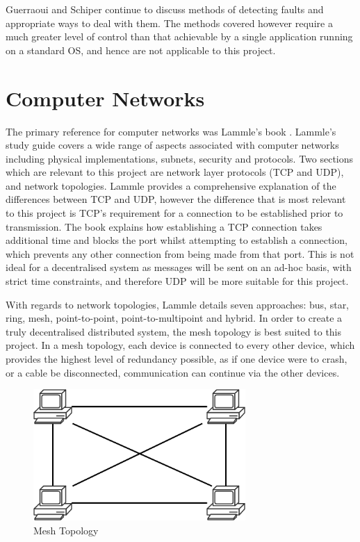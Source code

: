 \documentclass[a4paper, 11pt]{report}
\begin{document}
Guerraoui and Schiper continue to discuss methods of detecting faults and appropriate ways to deal with them. The methods covered however require a much greater level of control than that achievable by a single application running on a standard \acrshort{OS}, and hence are not applicable to this project.

\section{Computer Networks}
The primary reference for computer networks was Lammle's book  \cite{comptiaNet}. Lammle's study guide covers a wide range of aspects associated with computer networks including physical implementations, subnets, security and protocols. Two sections which are relevant to this project are network layer protocols (\acrshort{TCP} and \acrshort{UDP}), and network topologies. Lammle provides a comprehensive explanation of the differences between \acrfull{TCP} and \acrfull{UDP}, however the difference that is most relevant to this project is \acrshort{TCP}'s requirement for a connection to be established prior to transmission. The book explains how establishing a \acrshort{TCP} connection takes additional time and blocks the port whilst attempting to establish a connection, which prevents any other connection from being made from that port. This is not ideal for a decentralised system as messages will be sent on an ad-hoc basis, with strict time constraints, and therefore \acrshort{UDP} will be more suitable for this project.

With regards to network topologies, Lammle details seven approaches: bus, star, ring, mesh, point-to-point, point-to-multipoint and hybrid. In order to create a truly decentralised distributed system, the mesh topology is best suited to this project. In a mesh topology, each device is connected to every other device, which provides the highest level of redundancy possible, as if one device were to crash, or a cable be disconnected, communication can continue via the other devices.

\begin{figure}[H]
\centering
\includegraphics[height=5cm,keepaspectratio]{mesh}
\caption{Mesh Topology} 
\label{fig:mesh}
\end{figure}
\end{document}
